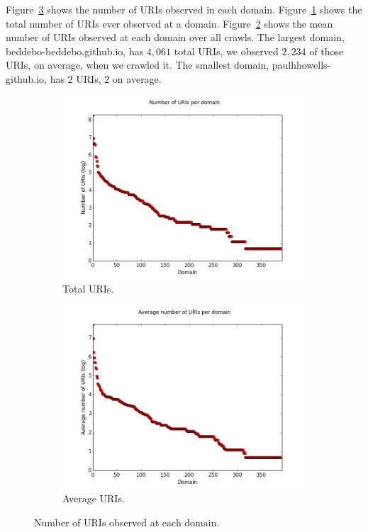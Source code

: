 \documentclass[11pt]{article}
\def \largestdomainname {beddebo-beddebo.github.io}
\def \largestdomaintotal {4,061}
\def \largestdomainmean {2,234}
\def \smallestdomainname {paulhhowells-github.io}
\def \smallestdomaintotal {2}
\def \smallestdomainmean {2}
\begin{document}
    Figure~\ref{fig:uris_per_domain} shows the number of URIs observed in each domain. Figure~\ref{fig:uris_per_domain:a} shows the total number of URIs ever observed at a domain. Figure~\ref{fig:uris_per_domain:b} shows the mean number of URIs observed at each domain over all crawls. The largest domain, \largestdomainname{}, has $\largestdomaintotal$ total URIs, we observed $\largestdomainmean$ of those URIs, on average, when we crawled it. The smallest domain, \smallestdomainname{}, has $\smallestdomaintotal$ URIs, $\smallestdomainmean$ on average.

    \begin{figure}
    \centering
    \begin{subfigure}{.5\textwidth}
      \centering
      \includegraphics[width=\linewidth]{images/uris_per_domain.png}
      \caption{Total URIs.}
      \label{fig:uris_per_domain:a}
    \end{subfigure}%
    \begin{subfigure}{.5\textwidth}
      \centering
      \includegraphics[width=\linewidth]{images/uris_per_domain_avg.png}
      \caption{Average URIs.}
      \label{fig:uris_per_domain:b}
    \end{subfigure}
    \caption{Number of URIs observed at each domain.}
    \label{fig:uris_per_domain}
    \end{figure}
\end{document}
